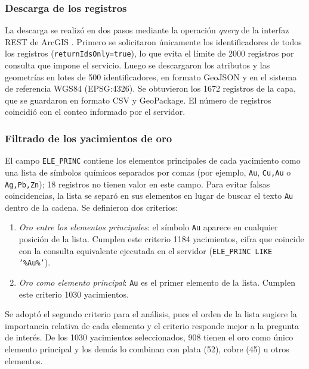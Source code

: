 \documentclass[man,12pt,a4paper,floatsintext,donotrepeattitle]{apa7}
\begin{document}
\subsubsection{Descarga de los registros}

La descarga se realizó en dos pasos mediante la operación \textit{query} de la
interfaz REST de ArcGIS \parencite{esri-query}. Primero se solicitaron
únicamente los identificadores de todos los registros
(\texttt{returnIdsOnly=true}), lo que evita el límite de 2000 registros por
consulta que impone el servicio. Luego se descargaron los atributos y las
geometrías en lotes de 500 identificadores, en formato GeoJSON y en el sistema
de referencia WGS84 (EPSG:4326). Se obtuvieron los 1672 registros de la capa,
que se guardaron en formato CSV y GeoPackage. El número de registros coincidió
con el conteo informado por el servidor.

\subsubsection{Filtrado de los yacimientos de oro}

El campo \texttt{ELE\_PRINC} contiene los elementos principales de cada
yacimiento como una lista de símbolos químicos separados por comas (por ejemplo,
\texttt{Au}, \texttt{Cu,Au} o \texttt{Ag,Pb,Zn}); 18 registros no tienen valor
en este campo. Para evitar falsas coincidencias, la lista se separó en sus
elementos en lugar de buscar el texto \texttt{Au} dentro de la cadena. Se
definieron dos criterios:

\begin{enumerate}
  \item \textit{Oro entre los elementos principales}: el símbolo \texttt{Au}
  aparece en cualquier posición de la lista. Cumplen este criterio 1184
  yacimientos, cifra que coincide con la consulta equivalente ejecutada en el
  servidor (\texttt{ELE\_PRINC LIKE '\%Au\%'}).
  \item \textit{Oro como elemento principal}: \texttt{Au} es el primer elemento
  de la lista. Cumplen este criterio 1030 yacimientos.
\end{enumerate}

Se adoptó el segundo criterio para el análisis, pues el orden de la lista sugiere
la importancia relativa de cada elemento y el criterio responde mejor a la
pregunta de interés. De los 1030 yacimientos seleccionados, 908 tienen el oro como
único elemento principal y los demás lo combinan con plata (52), cobre (45) u
otros elementos.
\end{document}
